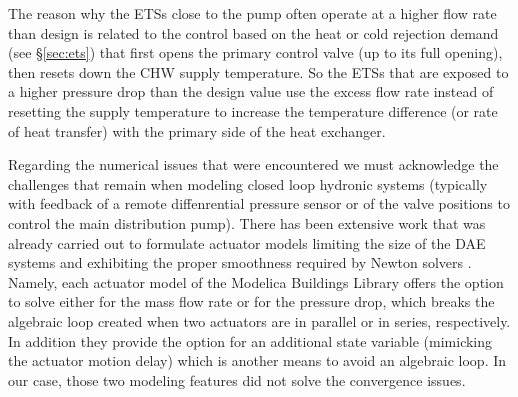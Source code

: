 The reason why the ETSs close to the pump often operate at a higher flow rate than design is related to the control based on the heat or cold rejection demand (see §\ref{sec:ets}) that first opens the primary control valve (up to its full opening), then resets down the CHW supply temperature. So the ETSs that are exposed to a higher pressure drop than the design value use the excess flow rate instead of resetting the supply temperature to increase the temperature difference (or rate of heat transfer) with the primary side of the heat exchanger.

Regarding the numerical issues that were encountered we must acknowledge the challenges that remain when modeling closed loop hydronic systems (typically with feedback of a remote diffenrential pressure sensor or of the valve positions to control the main distribution pump).
There has been extensive work that was already carried out to formulate actuator models limiting the size of the DAE systems and exhibiting the proper smoothness required by Newton solvers \cite{Jorissen2015}.
Namely, each actuator model of the Modelica Buildings Library offers the option to solve either for the mass flow rate or for the pressure drop, which breaks the algebraic loop created when two actuators are in parallel or in series, respectively. In addition they provide the option for an additional state variable (mimicking the actuator motion delay) which is another means to avoid an algebraic loop.
In our case, those two modeling features did not solve the convergence issues.

